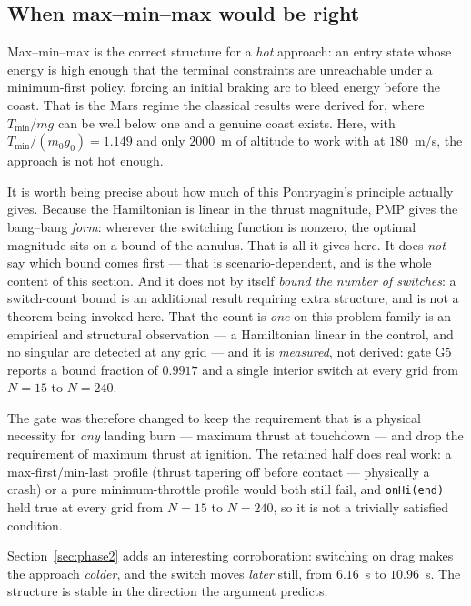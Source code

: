 \documentclass[11pt]{article}
\newcommand{\Tmin}{T_{\min}}
\begin{document}
\subsection{When max--min--max would be right}

Max--min--max is the correct structure for a \emph{hot} approach: an entry
state whose energy is high enough that the terminal constraints are
unreachable under a minimum-first policy, forcing an initial braking arc to
bleed energy before the coast. That is the Mars regime the classical results
were derived for, where $\Tmin/mg$ can be well below one and a genuine coast
exists. Here, with $\Tmin/(m_0 g_0) = 1.149$ and only $2000$~m of altitude
to work with at $180$~m/s, the approach is not hot enough.

It is worth being precise about how much of this Pontryagin's principle
actually gives. Because the Hamiltonian is linear in the thrust magnitude,
PMP gives the bang--bang \emph{form}: wherever the switching function is
nonzero, the optimal magnitude sits on a bound of the annulus. That is all
it gives here. It does \emph{not} say which bound comes first --- that is
scenario-dependent, and is the whole content of this section. And it does
not by itself \emph{bound the number of switches}: a switch-count bound is
an additional result requiring extra structure, and is not a theorem being
invoked here. That the count is \emph{one} on this problem family is an
empirical and structural observation --- a Hamiltonian linear in the
control, and no singular arc detected at any grid --- and it is
\emph{measured}, not derived: gate G5 reports a bound fraction of $0.9917$
and a single interior switch at every grid from $N = 15$ to $N = 240$.

The gate was therefore changed to keep the requirement that is a physical
necessity for \emph{any} landing burn --- maximum thrust at touchdown ---
and drop the requirement of maximum thrust at ignition. The retained half
does real work: a max-first/min-last profile (thrust tapering off before
contact --- physically a crash) or a pure minimum-throttle profile would
both still fail, and \texttt{onHi(end)} held true at every grid from $N=15$
to $N=240$, so it is not a trivially satisfied condition.

Section~\ref{sec:phase2} adds an interesting corroboration: switching on
drag makes the approach \emph{colder}, and the switch moves \emph{later}
still, from $6.16$~s to $10.96$~s. The structure is stable in the direction
the argument predicts.
\end{document}
